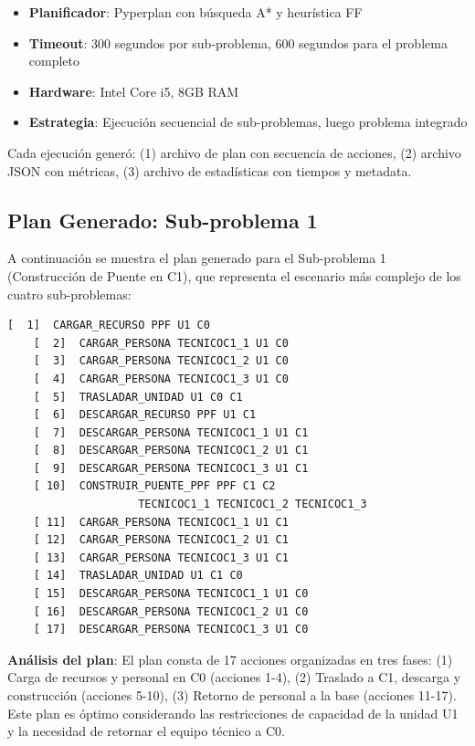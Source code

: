 \documentclass[conference]{IEEEtran}
\begin{document}
    \begin{itemize}[leftmargin=*,itemsep=1pt]
    \item \textbf{Planificador}: Pyperplan con búsqueda A* y heurística FF
    \item \textbf{Timeout}: 300 segundos por sub-problema, 600 segundos para el problema completo
    \item \textbf{Hardware}: Intel Core i5, 8GB RAM
    \item \textbf{Estrategia}: Ejecución secuencial de sub-problemas, luego problema integrado
    \end{itemize}

    Cada ejecución generó: (1) archivo de plan con secuencia de acciones, (2) archivo JSON con métricas, (3) archivo de estadísticas con tiempos y metadata.

    \subsection{Plan Generado: Sub-problema 1}

    A continuación se muestra el plan generado para el Sub-problema 1 (Construcción de Puente en C1), que representa el escenario más complejo de los cuatro sub-problemas:

    \begin{lstlisting}[basicstyle=\scriptsize\ttfamily,breaklines=true,frame=single,xleftmargin=0.2cm,xrightmargin=0.2cm,backgroundcolor=\color{gray!5}]
    [  1]  CARGAR_RECURSO PPF U1 C0
    [  2]  CARGAR_PERSONA TECNICOC1_1 U1 C0
    [  3]  CARGAR_PERSONA TECNICOC1_2 U1 C0
    [  4]  CARGAR_PERSONA TECNICOC1_3 U1 C0
    [  5]  TRASLADAR_UNIDAD U1 C0 C1
    [  6]  DESCARGAR_RECURSO PPF U1 C1
    [  7]  DESCARGAR_PERSONA TECNICOC1_1 U1 C1
    [  8]  DESCARGAR_PERSONA TECNICOC1_2 U1 C1
    [  9]  DESCARGAR_PERSONA TECNICOC1_3 U1 C1
    [ 10]  CONSTRUIR_PUENTE_PPF PPF C1 C2 
                    TECNICOC1_1 TECNICOC1_2 TECNICOC1_3
    [ 11]  CARGAR_PERSONA TECNICOC1_1 U1 C1
    [ 12]  CARGAR_PERSONA TECNICOC1_2 U1 C1
    [ 13]  CARGAR_PERSONA TECNICOC1_3 U1 C1
    [ 14]  TRASLADAR_UNIDAD U1 C1 C0
    [ 15]  DESCARGAR_PERSONA TECNICOC1_1 U1 C0
    [ 16]  DESCARGAR_PERSONA TECNICOC1_2 U1 C0
    [ 17]  DESCARGAR_PERSONA TECNICOC1_3 U1 C0
    \end{lstlisting}

    \textbf{Análisis del plan}: El plan consta de 17 acciones organizadas en tres fases: (1) Carga de recursos y personal en C0 (acciones 1-4), (2) Traslado a C1, descarga y construcción (acciones 5-10), (3) Retorno de personal a la base (acciones 11-17). Este plan es óptimo considerando las restricciones de capacidad de la unidad U1 y la necesidad de retornar el equipo técnico a C0.
\end{document}
